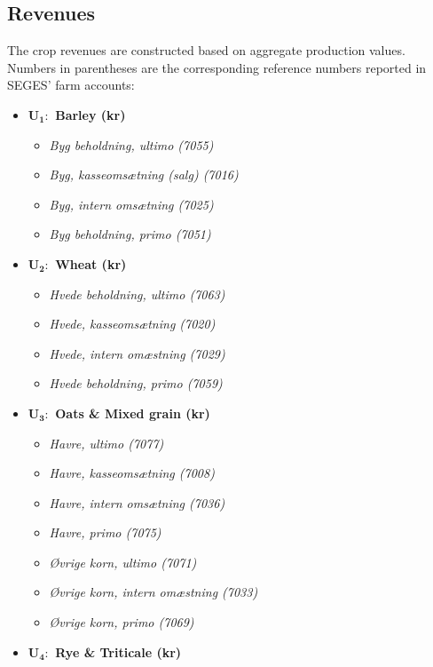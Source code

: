 \documentclass[12pt]{article}
\begin{document}
\subsection{Revenues}
\label{sec:revenues}
The crop revenues are constructed based on aggregate production values. 
Numbers in parentheses are the corresponding reference numbers reported in SEGES' farm accounts:
\begin{itemize}
    \item[] \textbf{U$_\textbf{1}:$ Barley (kr)}
    \begin{itemize}
        \item[$+$] \textit{Byg beholdning, ultimo (7055)}
        \item[$+$] \textit{Byg, kasseomsætning (salg) (7016)}
        \item[$+$] \textit{Byg, intern omsætning (7025)}
        \item[$-$] \textit{Byg beholdning, primo (7051)}
    \end{itemize}
    \item[] \textbf{U$_\textbf{2}:$ Wheat (kr)}
    \begin{itemize}
        \item[$+$] \textit{Hvede beholdning, ultimo (7063)}
        \item[$+$] \textit{Hvede, kasseomsætning (7020)}
        \item[$+$] \textit{Hvede, intern omæstning (7029)}
        \item[$-$] \textit{Hvede beholdning, primo (7059)}
    \end{itemize}
    \item[]  \textbf{U$_\textbf{3}:$ Oats \& Mixed grain (kr)}
    \begin{itemize}
        \item[$+$] \textit{Havre, ultimo (7077)}
        \item[$+$] \textit{Havre, kasseomsætning (7008)}
        \item[$+$] \textit{Havre, intern omsætning (7036)}
        \item[$-$] \textit{Havre, primo (7075)}
        \item[$+$] \textit{Øvrige korn, ultimo (7071)}
        \item[$+$] \textit{Øvrige korn, intern omæstning (7033)}
        \item[$-$] \textit{Øvrige korn, primo (7069)}
    \end{itemize}
    \item[] \textbf{U$_\textbf{4}:$ Rye \& Triticale (kr)}

\end{itemize}
\end{document}
